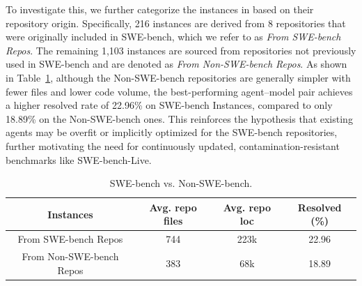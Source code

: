To investigate this, we further categorize the instances in \benchmark{} based on their repository origin. Specifically, 216 instances are derived from 8 repositories that were originally included in SWE-bench, which we refer to as \textit{From SWE-bench Repos}. The remaining 1,103 instances are sourced from repositories not previously used in SWE-bench and are denoted as \textit{From Non-SWE-bench Repos}. As shown in Table~\ref{tab:swe_vs_non_swe}, although the Non-SWE-bench repositories are generally simpler with fewer files and lower code volume, the best-performing agent–model pair achieves a higher resolved rate of 22.96\% on SWE-bench Instances, compared to only 18.89\% on the Non-SWE-bench ones. This reinforces the hypothesis that existing agents may be overfit or implicitly optimized for the SWE-bench repositories, further motivating the need for continuously updated, contamination-resistant benchmarks like SWE-bench-Live.

\begin{table}[h]
    \centering
    \vspace{-1em}
    \caption{SWE-bench vs. Non-SWE-bench.}
    \begin{tabular}{c|ccc}
    \toprule
      Instances & Avg. repo files & Avg. repo loc & 
      Resolved (\%) \\
    \midrule
      From SWE-bench Repos & 744 & 223k & 22.96 \\
      From Non-SWE-bench Repos & 383 & 68k & 18.89  \\
    \bottomrule
    \end{tabular}
    \vspace{-1em}
    \label{tab:swe_vs_non_swe}
\end{table}


